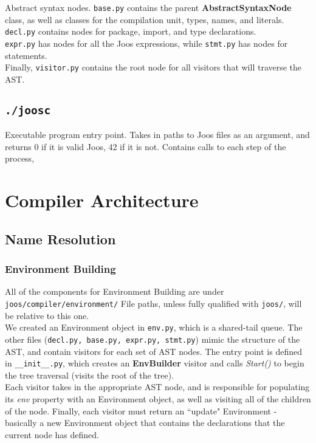 \documentclass[12pt, a4paper]{article}
\newcommand{\class}{\textbf}
\newcommand{\method}{\textit}
\begin{document}
Abstract syntax nodes. \verb|base.py| contains the parent \textbf{AbstractSyntaxNode} class, as well as classes for the compilation unit, types, names, and literals.\\ 

\verb|decl.py| contains nodes for package, import, and type declarations. \\

\verb|expr.py| has nodes for all the Joos expressions, while \verb|stmt.py| has nodes for statements. \\

Finally, \verb|visitor.py| contains the root node for all visitors that will traverse the AST.

\subsection{\texttt{./joosc}}

Executable program entry point. Takes in paths to Joos files as an argument, and returns 0 if it is valid Joos, 42 if it is not. Contains calls to each step of the process, 

\section{Compiler Architecture}

\subsection{Name Resolution}
\subsubsection{Environment Building}

All of the components for Environment Building are under \verb|joos/compiler/environment/| File paths, unless fully qualified with \verb|joos/|, will be relative to this one.\\

We created an Environment object in \verb|env.py|, which is a shared-tail queue. The other files (\verb|decl.py, base.py, expr.py, stmt.py|) mimic the structure of the AST, and contain visitors for each set of AST nodes. The entry point is defined in \verb|__init__.py|, which creates an \class{EnvBuilder} visitor and calls \method{Start()} to begin the tree traversal (visits the root of the tree). \\

Each visitor takes in the appropriate AST node, and is responsible for populating its \method{env} property with an Environment object, as well as visiting all of the children of the node. Finally, each visitor must return an ``update" Environment - basically a new Environment object that contains the declarations that the current node has defined. \\
\end{document}
